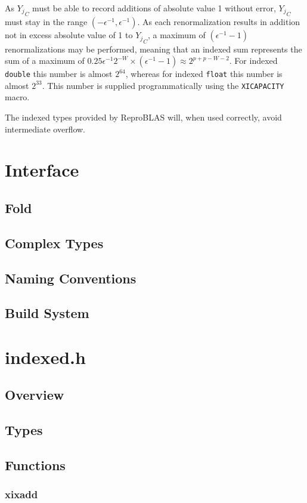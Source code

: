 \documentclass[12pt]{article}
\theoremstyle{plain}
\begin{document}
    As ${Y_j}_C$ must be able to record additions of absolute value 1 without error, ${Y_j}_C$ must stay in the range $(-\epsilon^{-1}, \epsilon^{-1})$. As each renormalization results in addition not in excess absolute value of 1 to ${Y_j}_C$, a maximum of $(\epsilon^{-1} - 1)$ renormalizations may be performed, meaning that an indexed sum represents the sum of a maximum of $0.25\epsilon^{-1}2^{-W} \times (\epsilon^{-1} - 1) \approx 2^{p + p - W - 2}$. For indexed \verb|double| this number is almost $2^{64}$, whereas for indexed \verb|float| this number is almost $2^{33}$. This number is supplied programmatically using the \verb|XICAPACITY| macro.

    The indexed types provided by ReproBLAS will, when used correctly, avoid intermediate overflow.

\section{Interface}
  \subsection{Fold}
  \subsection{Complex Types}
  \subsection{Naming Conventions}
  \subsection{Build System}
\section{indexed.h}
  \subsection{Overview}
  \subsection{Types}
  \subsection{Functions}
    \subsubsection{xixadd}
\end{document}
